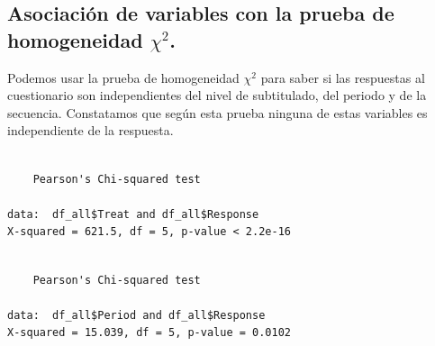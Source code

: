 \documentclass[
  12pt,
  a4paper,
  extrafontsizes,
  onecolumn,
  openright]{memoir}
\newenvironment{Shaded}{\begin{snugshade}}{\end{snugshade}}
\newcommand{\FunctionTok}[1]{\textcolor[rgb]{0.28,0.35,0.67}{#1}}
\newcommand{\NormalTok}[1]{\textcolor[rgb]{0.00,0.23,0.31}{#1}}
\newcommand{\SpecialCharTok}[1]{\textcolor[rgb]{0.37,0.37,0.37}{#1}}
\begin{document}
\hypertarget{asociaciuxf3n-de-variables-con-la-prueba-de-homogeneidad-chi2.}{%
\subsection{\texorpdfstring{Asociación de variables con la prueba de
homogeneidad
\(\chi^2\).}{Asociación de variables con la prueba de homogeneidad \textbackslash chi\^{}2.}}\label{asociaciuxf3n-de-variables-con-la-prueba-de-homogeneidad-chi2.}}

Podemos usar la prueba de homogeneidad \(\chi^2\) para saber si las
respuestas al cuestionario son independientes del nivel de subtitulado,
del periodo y de la secuencia. Constatamos que según esta prueba ninguna
de estas variables es independiente de la respuesta.

\scriptsize

\begin{Shaded}
\end{Shaded}

\begin{verbatim}

    Pearson's Chi-squared test

data:  df_all$Treat and df_all$Response
X-squared = 621.5, df = 5, p-value < 2.2e-16
\end{verbatim}

\begin{Shaded}
\end{Shaded}

\begin{verbatim}

    Pearson's Chi-squared test

data:  df_all$Period and df_all$Response
X-squared = 15.039, df = 5, p-value = 0.0102
\end{verbatim}

\begin{Shaded}
\end{Shaded}
\end{document}
